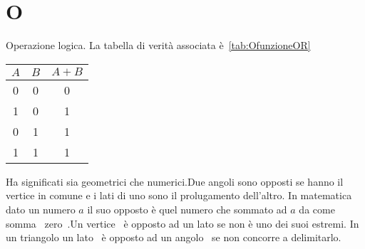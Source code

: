 \chapter{O}
\vspace{5mm}
Operazione logica. La tabella di verità associata è~\vref{tab:OfunzioneOR}
\begin{table}
	\label{tab:OfunzioneOR}
	\centering
	\begin{tabular}{ccc}
	\toprule
$A$&$B$&$A+B$\\
\midrule         
0&0&0\\
1&0&1\\
0&1&1\\
1&1&1\\
\bottomrule
\end{tabular}
\end{table}
Ha significati sia geometrici che numerici.Due angoli sono opposti se hanno il vertice in comune e i lati di uno sono  il prolugamento dell'altro.
In matematica dato un numero $a$ il suo opposto è quel numero che sommato ad $a$ da come somma\pointsto~ zero\pointsto~.Un vertice\pointsto~ è opposto ad un lato se non è uno dei suoi estremi. In un triangolo un lato\pointsto~ è opposto ad un angolo\pointsto~ se non concorre a delimitarlo.